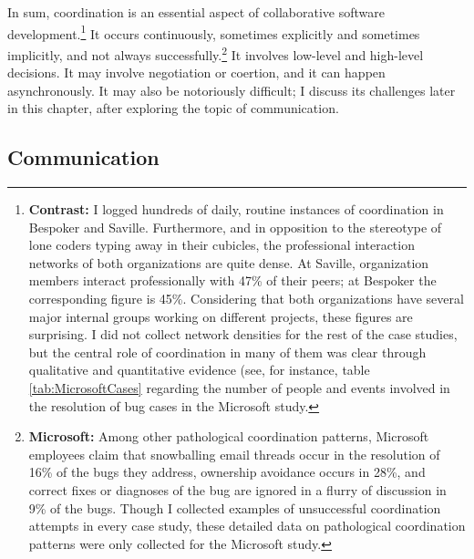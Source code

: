 In sum, coordination is an essential aspect of collaborative software development.\footnote{\textbf{Contrast:} I logged hundreds of daily, routine instances of coordination in Bespoker and Saville. Furthermore, and in opposition to the stereotype of lone coders typing away in their cubicles, the professional interaction networks of both organizations are quite dense. At Saville, organization members interact professionally with 47\% of their peers; at Bespoker the corresponding figure is 45\%. Considering that both organizations have several major internal groups working on different projects, these figures are surprising. I did not collect network densities for the rest of the case studies, but the central role of coordination in many of them was clear through qualitative and quantitative evidence (see, for instance, table \ref{tab:MicrosoftCases} regarding the number of people and events involved in the resolution of bug cases in the Microsoft study.} It occurs continuously, sometimes explicitly and sometimes implicitly, and not always successfully.\footnote{\textbf{Microsoft:} Among other pathological coordination patterns, Microsoft employees claim that snowballing email threads occur in the resolution of 16\% of the bugs they address, ownership avoidance occurs in 28\%, and correct fixes or diagnoses of the bug are ignored in a flurry of discussion in 9\% of the bugs. Though I collected examples of unsuccessful coordination attempts in every case study, these detailed data on pathological coordination patterns were only collected for the Microsoft study.} It involves low-level and high-level decisions. It may involve negotiation or coertion, and it can happen asynchronously. It may also be notoriously difficult; I discuss its challenges later in this chapter, after exploring the topic of communication.


\subsection{Communication}

